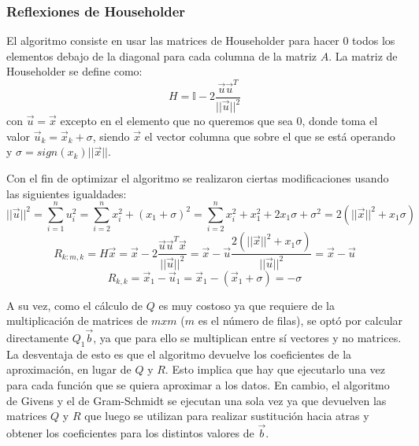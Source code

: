 \documentclass[journal, monochrome]{IEEEtran}
\begin{document}
\subsubsection{Reflexiones de Householder}
\par
El algoritmo consiste en usar las matrices de Householder para hacer 0 todos los elementos debajo de la diagonal para cada columna de la matriz $A$. La matriz de Householder se define como:
\begin{equation}
H = \mathbb{I} - 2\frac{\vec{u}\vec{u}^{T}}{||\vec{u}||^{2}}
\label{equation:householder}
\end{equation}
con $\vec{u} = \vec{x}$ excepto en el elemento que no queremos que sea 0, donde toma el valor $\vec{u}_{k} = \vec{x}_{k} + \sigma$, siendo $\vec{x}$ el vector columna que sobre el que se está operando y $\sigma = sign(x_{k})||\vec{x}||$.
\par
Con el fin de optimizar el algoritmo se realizaron ciertas modificaciones usando las siguientes igualdades:
\begin{equation}
||\vec{u}||^{2} = \sum_{i=1}^{n} u_{i}^{2} = \sum_{i=2}^{n} x_{i}^{2} + (x_{1}+\sigma)^{2}
 = \sum_{i=2}^{n} x_{i}^{2} + x_{1}^{2} + 2x_{1}\sigma + \sigma^{2} = 2(||\vec{x}||^{2} + x_{1}\sigma)
\end{equation}
\begin{equation}
R_{k:m,k} = H\vec{x} = \vec{x} - 2\frac{\vec{u}\vec{u}^{T}\vec{x}}{||\vec{u}||^{2}} = \vec{x} - \vec{u}\frac{2(||\vec{x}||^{2}+x_{1}\sigma)}{||\vec{u}||^{2}} = \vec{x} - \vec{u}
\end{equation}
\begin{equation}
R_{k,k} = \vec{x}_{1} - \vec{u}_{1} = \vec{x}_{1} - (\vec{x}_{1} + \sigma) = -\sigma
\end{equation}
\par
A su vez, como el cálculo de $Q$ es muy costoso ya que requiere de la multiplicación de matrices de $mxm$ ($m$ es el número de filas), se optó por calcular directamente $Q_{1}\vec{b}$, ya que para ello se multiplican entre sí vectores y no matrices. La desventaja de esto es que el algoritmo devuelve los coeficientes de la aproximación, en lugar de $Q$ y $R$. Esto implica que hay que ejecutarlo una vez para cada función que se quiera aproximar a los datos. En cambio, el algoritmo de Givens y el de Gram-Schmidt se ejecutan una sola vez ya que devuelven las matrices $Q$ y $R$ que luego se utilizan para realizar sustitución hacia atras y obtener los coeficientes para los distintos valores de $\vec{b}$.
\end{document}
